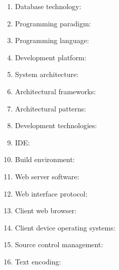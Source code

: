 \documentclass{article}
\begin{document}
	\begin{enumerate}
		\item Database technology: 
		\item Programming paradigm: 
		\item Programming language: 
		\item Development platform:  
		\item System architecture: 
		\item Architectural frameworks: 
		\item Architectural patterns: 
		\item Development technologies:
		\item IDE:
		\item Build environment:
		\item Web server software:
		\item Web interface protocol:
		\item Client web browser:
		\item Client device operating systems:
		\item Source control management: 
		\item Text encoding: 
	\end{enumerate}
\end{document}
